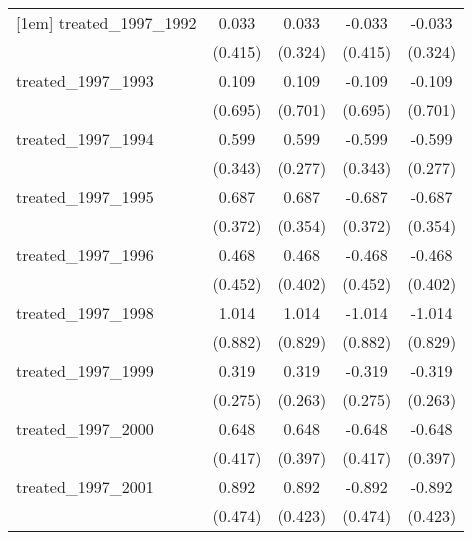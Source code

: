 {\begin{tabular}{l*{4}{c}}
[1em]
treated\_1997\_1992&       0.033         &       0.033         &      -0.033         &      -0.033         \\
            &     (0.415)         &     (0.324)         &     (0.415)         &     (0.324)         \\
[1em]
treated\_1997\_1993&       0.109         &       0.109         &      -0.109         &      -0.109         \\
            &     (0.695)         &     (0.701)         &     (0.695)         &     (0.701)         \\
[1em]
treated\_1997\_1994&       0.599         &       0.599\sym{*}  &      -0.599         &      -0.599\sym{*}  \\
            &     (0.343)         &     (0.277)         &     (0.343)         &     (0.277)         \\
[1em]
treated\_1997\_1995&       0.687         &       0.687         &      -0.687         &      -0.687         \\
            &     (0.372)         &     (0.354)         &     (0.372)         &     (0.354)         \\
[1em]
treated\_1997\_1996&       0.468         &       0.468         &      -0.468         &      -0.468         \\
            &     (0.452)         &     (0.402)         &     (0.452)         &     (0.402)         \\
[1em]
treated\_1997\_1998&       1.014         &       1.014         &      -1.014         &      -1.014         \\
            &     (0.882)         &     (0.829)         &     (0.882)         &     (0.829)         \\
[1em]
treated\_1997\_1999&       0.319         &       0.319         &      -0.319         &      -0.319         \\
            &     (0.275)         &     (0.263)         &     (0.275)         &     (0.263)         \\
[1em]
treated\_1997\_2000&       0.648         &       0.648         &      -0.648         &      -0.648         \\
            &     (0.417)         &     (0.397)         &     (0.417)         &     (0.397)         \\
[1em]
treated\_1997\_2001&       0.892         &       0.892\sym{*}  &      -0.892         &      -0.892\sym{*}  \\
            &     (0.474)         &     (0.423)         &     (0.474)         &     (0.423)         \\

\end{tabular}}
